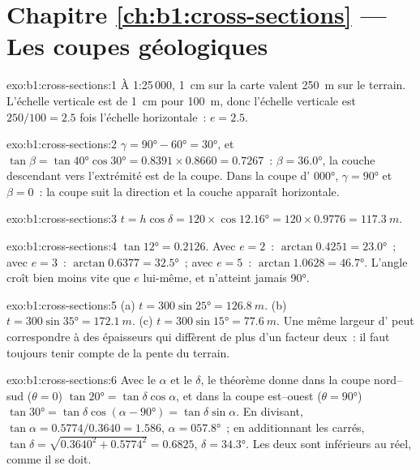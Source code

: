 \section*{Chapitre \ref{ch:b1:cross-sections} --- Les coupes géologiques}

\begin{solution}{exo:b1:cross-sections:1}
À 1:25\,000, \qty{1}{cm} sur la carte valent \qty{250}{m} sur le terrain.
L'échelle verticale est de \qty{1}{cm} pour \qty{100}{m}, donc l'échelle verticale
est $250/100 = 2.5$ fois l'échelle horizontale~: $e = 2.5$.
\end{solution}

\begin{solution}{exo:b1:cross-sections:2}
$\gamma = \ang{90} - \ang{60} = \ang{30}$, et $\tan\beta = \tan\ang{40}
\cos\ang{30} = 0.8391\times0.8660 = 0.7267$~: $\beta = \ang{36.0}$, la couche
descendant vers l'extrémité est de la coupe. Dans la coupe d'
\ang{000}, $\gamma = \ang{90}$ et $\beta = 0$~: la coupe suit la direction et la
couche apparaît horizontale.
\end{solution}

\begin{solution}{exo:b1:cross-sections:3}
$t = h\cos\delta = 120\times\cos\ang{12.16} = 120\times0.9776 =
\qty{117.3}{m}$.
\end{solution}

\begin{solution}{exo:b1:cross-sections:4}
$\tan\ang{12} = 0.2126$. Avec $e = 2$~: $\arctan 0.4251 = \ang{23.0}$~; avec
$e = 3$~: $\arctan 0.6377 = \ang{32.5}$~; avec $e = 5$~: $\arctan 1.0628 =
\ang{46.7}$. L'angle croît bien moins vite que $e$ lui-même, et n'atteint jamais
\ang{90}.
\end{solution}

\begin{solution}{exo:b1:cross-sections:5}
(a) $t = 300\sin\ang{25} = \qty{126.8}{m}$. (b) $t = 300\sin\ang{35} =
\qty{172.1}{m}$. (c) $t = 300\sin\ang{15} = \qty{77.6}{m}$. Une même largeur
d' peut correspondre à des épaisseurs qui diffèrent de plus d'un
facteur deux~: il faut toujours tenir compte de la pente du terrain.
\end{solution}

\begin{solution}{exo:b1:cross-sections:6}
Avec le  $\alpha$ et le  $\delta$, le théorème donne dans la
coupe nord--sud ($\theta = 0$) $\tan\ang{20} = \tan\delta\cos\alpha$,
et dans la coupe est--ouest ($\theta = \ang{90}$) $\tan\ang{30} =
\tan\delta\cos(\alpha - \ang{90}) = \tan\delta\sin\alpha$. En divisant,
$\tan\alpha = 0.5774/0.3640 = 1.586$, $\alpha = \ang{057.8}$~; en additionnant
les carrés, $\tan\delta = \sqrt{0.3640^2 + 0.5774^2} = 0.6825$, $\delta =
\ang{34.3}$. Les deux  sont inférieurs au  réel, comme
il se doit.
\end{solution}

